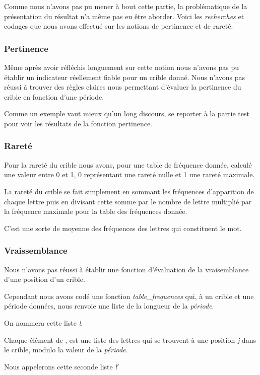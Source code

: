 \documentclass[a4paper, 11pt]{article}
\begin{document}
Comme nous n'avons pas pu mener à bout cette partie, la problématique
de la présentation du résultat n'a même pas eu être aborder.
Voici les \textit{recherches} et codages que nous avons effectué sur
les notions de pertinence et de rareté.

\subsubsection{Pertinence}
Même après avoir réfléchis longuement sur cette notion nous n'avons
pas pu établir un indicateur réellement fiable pour un crible donné.
Nous n'avons pas réussi à trouver des règles claires nous permettant
d'évaluer la pertinence du crible en fonction d'une période.

Comme un exemple vaut mieux qu'un long discours, se reporter à la
partie test pour voir les résultats de la fonction pertinence.


\subsubsection{Rareté}
Pour la rareté du crible nous avons, pour une table de
fréquence donnée, calculé une valeur entre 0 et 1, 0 représentant une
rareté nulle et 1 une rareté maximale.

La rareté du crible se fait simplement en sommant les fréquences
d'apparition de chaque lettre puis en divisant cette somme par le
nombre de lettre multiplié par la fréquence maximale pour la table des
fréquences donnée.

C'est une sorte de moyenne des fréquences des lettres qui constituent
le mot.

\subsubsection{Vraissemblance}
Nous n'avons pas réussi à établir une fonction d'évaluation de la
vraisemblance d'une position d'un crible.

Cependant nous avons codé une fonction \textit{table\_frequences} qui, à un
crible et une période données, nous renvoie une liste de la longueur
de la \textit{période}.

On nommera cette liste \textit{l}.

Chaque élément de , est une liste des
lettres qui se trouvent à une position \textit{j} dans le crible, modulo
la valeur de la \textit{période}.

Nous appelerons cette seconde liste \textit{l$'$}
\end{document}
